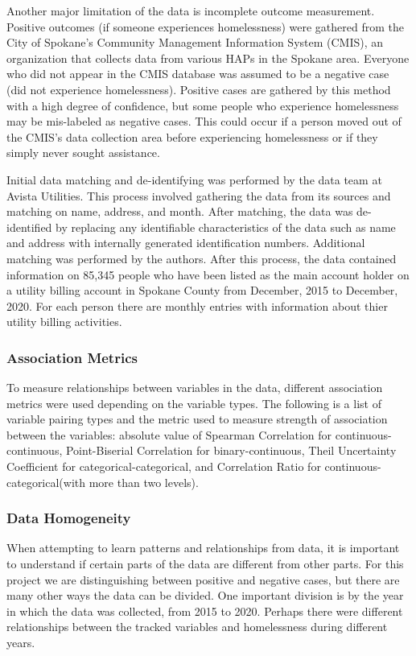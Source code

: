 \documentclass[utf8]{frontiersFPHY} %
\begin{document}
Another major limitation of the data is incomplete outcome measurement. Positive outcomes (if someone experiences homelessness) were gathered from the City of Spokane's Community Management Information System (CMIS), an organization that collects data from various HAPs in the Spokane area. Everyone who did not appear in the CMIS database was assumed to be a negative case (did not experience homelessness). Positive cases are gathered by this method with a high degree of confidence, but some people who experience homelessness may be mis-labeled as negative cases. This could occur if a person moved out of the CMIS's data collection area before experiencing homelessness or if they simply never sought assistance.

Initial data matching and de-identifying was performed by the data team at Avista Utilities. This process involved gathering the data from its sources and matching on name, address, and month. After matching, the data was de-identified by replacing any identifiable characteristics of the data such as name and address with internally generated identification numbers. Additional matching was performed by the authors. After this process, the data contained information on 85,345 people who have been listed as the main account holder on a utility billing account in Spokane County from December, 2015 to December, 2020. For each person there are monthly entries with information about thier utility billing activities. 

\subsubsection{Association Metrics}
To measure relationships between variables in the data, different association metrics were used depending on the variable types. The following is a list of variable pairing types and the metric used to measure strength of association between the variables: absolute value of Spearman Correlation for continuous-continuous, Point-Biserial Correlation for binary-continuous, Theil Uncertainty Coefficient for categorical-categorical, and Correlation Ratio for continuous-categorical(with more than two levels).

\subsubsection{Data Homogeneity}
When attempting to learn patterns and relationships from data, it is important to understand if certain parts of the data are different from other parts. For this project we are distinguishing between positive and negative cases, but there are many other ways the data can be divided. One important division is by the year in which the data was collected, from 2015 to 2020. Perhaps there were different relationships between the tracked variables and homelessness during different years. 
\end{document}

